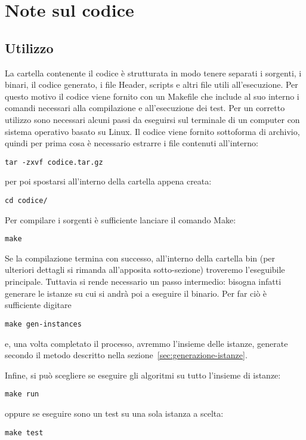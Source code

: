
\section{Note sul codice}\label{sec:codice}
\subsection{Utilizzo}\label{subsec:utilizzo}
La cartella contenente il codice è strutturata in modo tenere separati i sorgenti, i binari, il codice generato,
i file Header, scripts e altri file utili all'esecuzione.
Per questo motivo il codice viene fornito con un \textsf{Makefile} che include al suo interno i comandi
necessari alla compilazione e all'esecuzione dei test.
Per un corretto utilizzo sono necessari alcuni passi da eseguirsi sul terminale di un computer con sistema
operativo basato su Linux.
%
Il codice viene fornito sottoforma di archivio, quindi per prima cosa è necessario estrarre
i file contenuti all'interno:
\label{lst:make-passo-1}
\begin{lstlisting}[style=BashStyle]
tar -zxvf codice.tar.gz
\end{lstlisting}
per poi spostarsi all'interno della cartella appena creata:
\label{lst:make-passo-2}
\begin{lstlisting}[style=BashStyle]
cd codice/
\end{lstlisting}
%
Per compilare i sorgenti è sufficiente lanciare il comando \textsf{Make}:
\label{lst:make-passo-3}
\begin{lstlisting}[style=BashStyle]
make
\end{lstlisting}
%
Se la compilazione termina con successo, all'interno della
cartella \textsf{bin} (per ulteriori dettagli si rimanda all'apposita sotto-sezione) troveremo
l'eseguibile principale.
Tuttavia si rende necessario un passo intermedio: bisogna infatti generare le istanze su cui si andrà
poi a eseguire il binario.
Per far ciò è sufficiente digitare
\label{lst:make-passo-4}
\begin{lstlisting}[style=BashStyle]
make gen-instances
\end{lstlisting}
e, una volta completato il processo, avremmo l'insieme delle istanze, generate secondo il metodo
descritto nella sezione~\ref{sec:generazione-istanze}.

Infine, si può scegliere se eseguire gli algoritmi su tutto l'insieme di istanze:
\label{lst:make-passo-5}
\begin{lstlisting}[style=BashStyle]
make run
\end{lstlisting}
oppure se eseguire sono un test su una sola istanza a scelta:
\label{lst:make-passo-6}
\begin{lstlisting}[style=BashStyle]
make test
\end{lstlisting}
